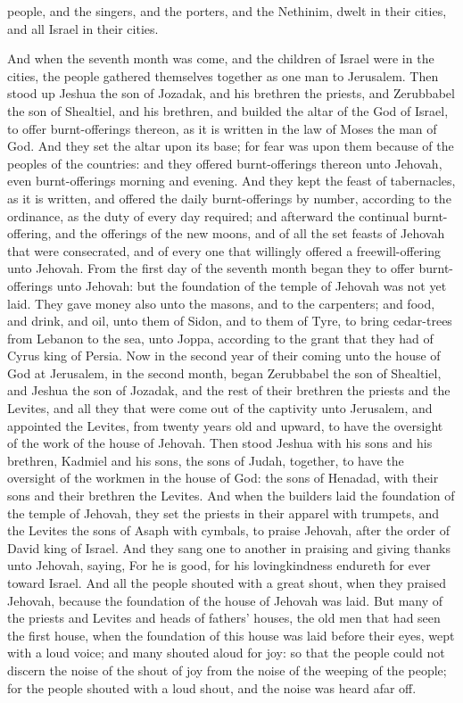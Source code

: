 people, and the singers, and the porters, and the Nethinim, dwelt in their cities, and all Israel in their cities. 

And when the seventh month was come, and the children of Israel were in the cities, the people gathered themselves together as one man to Jerusalem. Then stood up Jeshua the son of Jozadak, and his brethren the priests, and Zerubbabel the son of Shealtiel, and his brethren, and builded the altar of the God of Israel, to offer burnt-offerings thereon, as it is written in the law of Moses the man of God. And they set the altar upon its base; for fear was upon them because of the peoples of the countries: and they offered burnt-offerings thereon unto Jehovah, even burnt-offerings morning and evening. And they kept the feast of tabernacles, as it is written, and offered the daily burnt-offerings by number, according to the ordinance, as the duty of every day required; and afterward the continual burnt-offering, and the offerings of the new moons, and of all the set feasts of Jehovah that were consecrated, and of every one that willingly offered a freewill-offering unto Jehovah. From the first day of the seventh month began they to offer burnt-offerings unto Jehovah: but the foundation of the temple of Jehovah was not yet laid. They gave money also unto the masons, and to the carpenters; and food, and drink, and oil, unto them of Sidon, and to them of Tyre, to bring cedar-trees from Lebanon to the sea, unto Joppa, according to the grant that they had of Cyrus king of Persia.  Now in the second year of their coming unto the house of God at Jerusalem, in the second month, began Zerubbabel the son of Shealtiel, and Jeshua the son of Jozadak, and the rest of their brethren the priests and the Levites, and all they that were come out of the captivity unto Jerusalem, and appointed the Levites, from twenty years old and upward, to have the oversight of the work of the house of Jehovah. Then stood Jeshua with his sons and his brethren, Kadmiel and his sons, the sons of Judah, together, to have the oversight of the workmen in the house of God: the sons of Henadad, with their sons and their brethren the Levites. And when the builders laid the foundation of the temple of Jehovah, they set the priests in their apparel with trumpets, and the Levites the sons of Asaph with cymbals, to praise Jehovah, after the order of David king of Israel. And they sang one to another in praising and giving thanks unto Jehovah, saying, For he is good, for his lovingkindness endureth for ever toward Israel. And all the people shouted with a great shout, when they praised Jehovah, because the foundation of the house of Jehovah was laid. But many of the priests and Levites and heads of fathers’ houses, the old men that had seen the first house, when the foundation of this house was laid before their eyes, wept with a loud voice; and many shouted aloud for joy: so that the people could not discern the noise of the shout of joy from the noise of the weeping of the people; for the people shouted with a loud shout, and the noise was heard afar off. 

